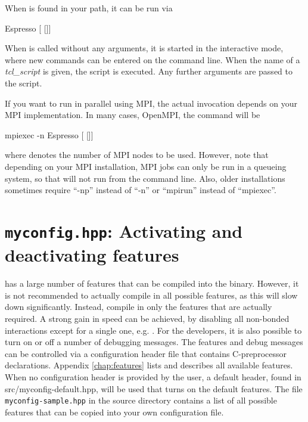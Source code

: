 When \es is found in your path, it can be run via
\begin{code}
Espresso [ []]
\end{code}

 When \es{} is called without any arguments,
it is started in the interactive mode, where new commands can be
entered on the command line. When the name of a \textit{tcl\_script}
is given, the script is executed. Any further arguments are passed to
the script.

If you want to run \es in parallel using MPI, the actual invocation
depends on your MPI implementation. In many cases, \eg OpenMPI, the
command will be
\begin{code}
mpiexec -n  Espresso [ []]
\end{code}
where  denotes the number of MPI nodes to be used.
However, note that depending on your MPI installation, MPI jobs can
only be run in a queueing system, so that \es will not run from the
command line. Also, older installations sometimes require ``-np''
instead of ``-n'' or ``mpirun'' instead of ``mpiexec''. 


\section{\texttt{myconfig.hpp}: Activating and deactivating features}
\label{sec:myconfig}

   \es
has a large number of features that can be compiled into the binary.
However, it is not recommended to actually compile in all possible
features, as this will slow down \es significantly.  Instead, compile
in only the features that are actually required.  A strong gain in
speed can be achieved, by disabling all non-bonded interactions except
for a single one, e.g. .  For the developers,
it is also possible to turn on or off a number of debugging messages.
The features and debug messages can be controlled via a configuration
header file that contains C-preprocessor declarations. Appendix
\vref{chap:features} lists and describes all available features.  When
no configuration header is provided by the user, a default header,
found in src/myconfig-default.hpp, will be used that turns on the
default features.  The file \texttt{myconfig-sample.hpp} in the source
directory contains a list of all possible features that can be copied
into your own configuration file.

